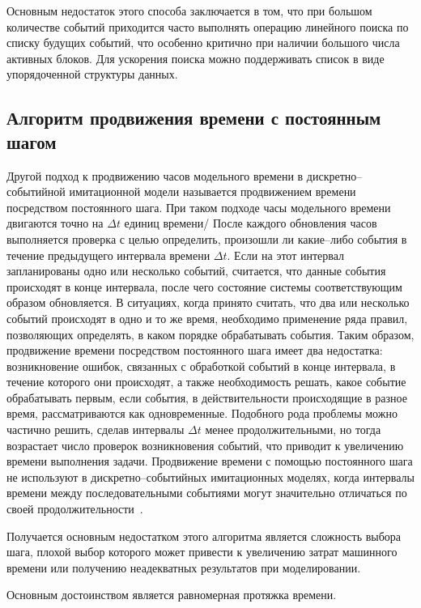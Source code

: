 Основным недостаток этого способа заключается в том, что при большом количестве событий приходится часто выполнять операцию линейного поиска по списку будущих событий, что особенно критично при наличии большого числа активных блоков. Для ускорения поиска можно поддерживать список в виде упорядоченной структуры данных.

\subsection{Алгоритм продвижения времени с постоянным шагом}

Другой подход к продвижению часов модельного времени в дискретно--событийной имитационной модели называется продвижением времени посредством постоянного шага. При таком подходе часы модельного времени двигаются точно на $\Delta t$ единиц времени/ После каждого обновления часов выполняется проверка с целью определить, произошли ли какие--либо события в течение предыдущего интервала времени $\Delta t$. Если на этот интервал запланированы одно или несколько событий, считается, что данные события происходят в конце интервала, после чего состояние системы соответствующим образом обновляется. В ситуациях, когда принято считать, что два или несколько событий происходят в одно и то же время, необходимо применение ряда
правил, позволяющих определять, в каком порядке обрабатывать события. Таким образом, продвижение времени посредством постоянного шага имеет два недостатка: возникновение ошибок, связанных с обработкой событий в конце интервала, в течение которого они происходят, а также необходимость решать, какое событие обрабатывать первым, если события, в действительности происходящие в разное время, рассматриваются как одновременные. Подобного рода проблемы можно частично решить, сделав интервалы $\Delta t$ менее продолжительными, но тогда
возрастает число проверок возникновения событий, что приводит к увеличению времени выполнения задачи. Продвижение времени с помощью постоянного шага не используют в дискретно--событийных имитационных моделях, когда интервалы времени между последовательными событиями могут значительно отличаться по своей продолжительности~\cite{time_alg2}. 

Получается основным недостатком этого алгоритма является сложность выбора шага, плохой выбор которого может привести к увеличению затрат машинного времени или получению неадекватных результатов при моделировании.

Основным достоинством является равномерная протяжка времени. 

